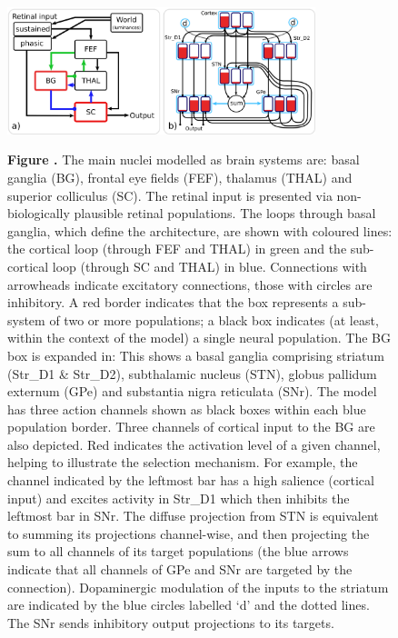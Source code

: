 \documentclass{frontiersSCNS}
\begin{document}
\begin{figure}[htb!]
\begin{center}
\includegraphics[width=0.8\textwidth]{./figures/ccg_model.png}
\end{center}
\textbf{\label{fig:ccg_model} Figure .}
{  The main
nuclei modelled as brain systems are: basal ganglia (BG), frontal eye
fields (FEF), thalamus (THAL) and superior colliculus (SC). The
retinal input is presented via non-biologically plausible retinal
populations. The loops through basal ganglia, which define the
architecture, are shown with coloured lines: the cortical loop
(through FEF and THAL) in green and the sub-cortical loop (through SC
and THAL) in blue. Connections with arrowheads indicate excitatory
connections, those with circles are inhibitory. A red border indicates
that the box represents a sub-system of two or more populations; a
black box indicates (at least, within the context of the model) a
single neural population. The BG box is expanded in: 
%
This shows a basal ganglia comprising striatum (Str\_D1 \& Str\_D2),
subthalamic nucleus (STN), globus pallidum externum (GPe) and
substantia nigra reticulata (SNr). The model has three action channels
shown as black boxes within each blue population border. Three
channels of cortical input to the BG are also depicted. Red indicates
the activation level of a given channel, helping to illustrate the
selection mechanism. For example, the channel indicated by the
leftmost bar has a high salience (cortical input) and excites activity
in Str\_D1 which then inhibits the leftmost bar in SNr. The diffuse
projection from STN is equivalent to summing its projections
channel-wise, and then projecting the sum to all channels of its
target populations (the blue arrows indicate that all channels of GPe
and SNr are targeted by the connection). Dopaminergic modulation of
the inputs to the striatum are indicated by the blue circles labelled
`d' and the dotted lines. The SNr sends inhibitory output projections
to its targets.}
\end{figure}
\end{document}
